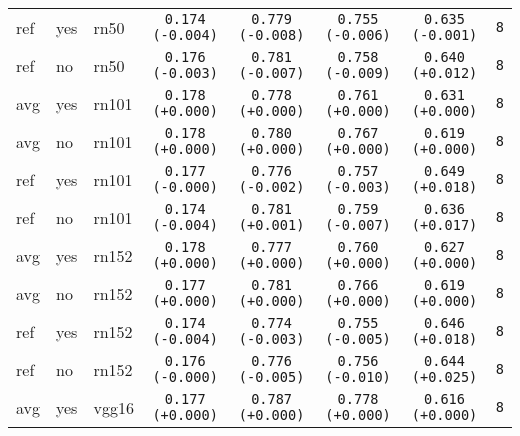 \begin{tabular}{|l|l|l|c|c|c|c|c|}
\hline
ref & yes & rn50 & \texttt{0.174 {\color{red}(-0.004)}} & \texttt{0.779 {\color{green}(-0.008)}} & \texttt{0.755 {\color{green}(-0.006)}} & \texttt{0.635 {\color{red}(-0.001)}} & \texttt{8} \\
ref & no & rn50 & \texttt{0.176 {\color{red}(-0.003)}} & \texttt{0.781 {\color{green}(-0.007)}} & \texttt{0.758 {\color{green}(-0.009)}} & \texttt{0.640 {\color{green}(+0.012)}} & \texttt{8} \\
\hline
\rowcolor{verylightgray}avg & yes & rn101 & \texttt{0.178 {\color{black}(+0.000)}} & \texttt{0.778 {\color{black}(+0.000)}} & \texttt{0.761 {\color{black}(+0.000)}} & \texttt{0.631 {\color{black}(+0.000)}} & \texttt{8} \\
\rowcolor{verylightgray}avg & no & rn101 & \texttt{0.178 {\color{black}(+0.000)}} & \texttt{0.780 {\color{black}(+0.000)}} & \texttt{0.767 {\color{black}(+0.000)}} & \texttt{0.619 {\color{black}(+0.000)}} & \texttt{8} \\
\hline
ref & yes & rn101 & \texttt{0.177 {\color{black}(-0.000)}} & \texttt{0.776 {\color{green}(-0.002)}} & \texttt{0.757 {\color{green}(-0.003)}} & \texttt{0.649 {\color{green}(+0.018)}} & \texttt{8} \\
ref & no & rn101 & \texttt{0.174 {\color{red}(-0.004)}} & \texttt{0.781 {\color{red}(+0.001)}} & \texttt{0.759 {\color{green}(-0.007)}} & \texttt{0.636 {\color{green}(+0.017)}} & \texttt{8} \\
\hline
\rowcolor{verylightgray}avg & yes & rn152 & \texttt{0.178 {\color{black}(+0.000)}} & \texttt{0.777 {\color{black}(+0.000)}} & \texttt{0.760 {\color{black}(+0.000)}} & \texttt{0.627 {\color{black}(+0.000)}} & \texttt{8} \\
\rowcolor{verylightgray}avg & no & rn152 & \texttt{0.177 {\color{black}(+0.000)}} & \texttt{0.781 {\color{black}(+0.000)}} & \texttt{0.766 {\color{black}(+0.000)}} & \texttt{0.619 {\color{black}(+0.000)}} & \texttt{8} \\
\hline
ref & yes & rn152 & \texttt{0.174 {\color{red}(-0.004)}} & \texttt{0.774 {\color{green}(-0.003)}} & \texttt{0.755 {\color{green}(-0.005)}} & \texttt{0.646 {\color{green}(+0.018)}} & \texttt{8} \\
ref & no & rn152 & \texttt{0.176 {\color{black}(-0.000)}} & \texttt{0.776 {\color{green}(-0.005)}} & \texttt{0.756 {\color{green}(-0.010)}} & \texttt{0.644 {\color{green}(+0.025)}} & \texttt{8} \\
\hline
\rowcolor{verylightgray}avg & yes & vgg16 & \texttt{0.177 {\color{black}(+0.000)}} & \texttt{0.787 {\color{black}(+0.000)}} & \texttt{0.778 {\color{black}(+0.000)}} & \texttt{0.616 {\color{black}(+0.000)}} & \texttt{8} \\

\end{tabular}
